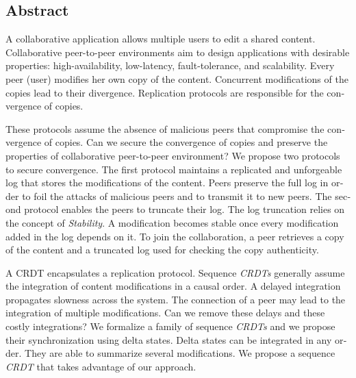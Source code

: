 \begin{ThesisAbstract}
\begin{otherlanguage}{english}
\subsection*{\centering Abstract}

A collaborative application allows multiple users to edit a shared content.
Collaborative peer-to-peer environments aim to design applications with desirable properties: high-availability, low-latency, fault-tolerance, and scalability.
Every peer (user) modifies her own copy of the content.
Concurrent modifications of the copies lead to their divergence.
Replication protocols are responsible for the convergence of copies.

These protocols assume the absence of malicious peers that compromise the convergence of copies.
Can we secure the convergence of copies and preserve the properties of collaborative peer-to-peer environment?
We propose two protocols to secure convergence.
The first protocol maintains a replicated and unforgeable log that stores the modifications of the content.
Peers preserve the full log in order to foil the attacks of malicious peers and to transmit it to new peers.
The second protocol enables the peers to truncate their log.
The log truncation relies on the concept of \emph{Stability}.
A modification becomes stable once every modification added in the log depends on it.
To join the collaboration, a peer retrieves a copy of
the content and a truncated log used for checking the copy authenticity.

A \acf{CRDT} encapsulates a replication protocol.
Sequence \emph{CRDTs} generally assume the integration of content modifications in a causal order.
A delayed integration propagates slowness across the system.
The connection of a peer may lead to the integration of multiple modifications.
Can we remove these delays and these costly integrations?
We formalize a family of sequence \emph{CRDTs} and we propose their synchronization using delta states.
Delta states can be integrated in any order.
They are able to summarize several modifications.
We propose a sequence \emph{CRDT} that takes advantage of our approach.
\end{otherlanguage}
\end{ThesisAbstract}
